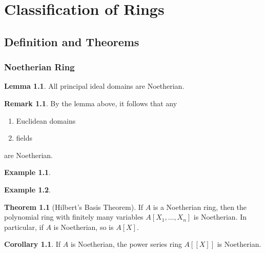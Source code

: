 \documentclass[a4paper]{book}
\theoremstyle{definition}
\newtheorem{example}{Example}[definition]
\newtheorem{theorem}[definition]{Theorem}
\newtheorem{corollary}{Corollary}
\newtheorem{lemma}[definition]{Lemma}
\newtheorem*{remark}{Remark}
\begin{document}





\chapter{Classification of Rings}
\section{Definition and Theorems}
\subsection{Noetherian Ring}

\begin{thmbox}
    \begin{lemma}
        All principal ideal domains are Noetherian.
    \end{lemma}
\end{thmbox}

\begin{rembox}
    \begin{remark}
        By the lemma above, it follows that any
        \begin{enumerate}
            \item Euclidean domains
            \item fields
        \end{enumerate}
        are Noetherian.
    \end{remark}
\end{rembox}

\begin{example}
    
\end{example}

\begin{example}
    
\end{example}

\begin{thmbox}
    \begin{theorem}[Hilbert's Basis Theorem]
        If \(A\) is a Noetherian ring, then the polynomial ring with finitely many variables \(A[X_1, \ldots, X_n]\) is Noetherian. In particular, if \(A\) is Noetherian, so is \(A[X]\).
    \end{theorem}
\end{thmbox}

\begin{thmbox}
    \begin{corollary}
        If \(A\) is Noetherian, the power series ring \(A[[X]]\) is Noetherian.
    \end{corollary}
\end{thmbox}
\end{document}
